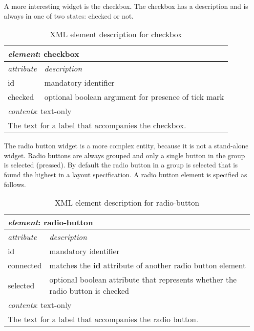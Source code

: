 \documentclass{article}
\begin{document}
    A more interesting widget is the checkbox. The checkbox has a description
    and is always in one of two states: checked or not. 
    
    \begin{table}[H]
     \begin{center}
     \begin{tabular}{|l|l|}
       \hline
        \multicolumn{2}{|l|}{\textit{element}: checkbox} \\
       \hline \hline
        \textit{attribute} & \textit{description} \\
       \hline
        id                 & mandatory identifier \\
        checked            & optional boolean argument for presence of tick mark \\
       \hline \hline
        \multicolumn{2}{|l|}{\textit{contents}: text-only} \\
       \hline
         \multicolumn{2}{|l|}{The text for a label that accompanies the checkbox.} \\
       \hline
     \end{tabular}
     \end{center}
     \label{figure:element_checkbox}
     \caption{XML element description for checkbox}
    \end{table}

    The radio button widget is a more complex entity, because it is not a
    stand-alone widget. Radio buttons are always grouped and only a single button in the
    group is selected (pressed).  By default the radio button in a group is
    selected that is found the highest in a layout specification. A radio button
    element is specified as follows.

    \begin{table}[H]
     \begin{center}
     \begin{tabular}{|l|l|}
       \hline
        \multicolumn{2}{|l|}{\textit{element}: radio-button} \\
       \hline \hline
        \textit{attribute} & \textit{description} \\
       \hline
        id                 & mandatory identifier \\
        connected          & matches the \textbf{id} attribute of another radio button element \\
        selected           & optional boolean attribute that represents whether the radio button is checked \\
       \hline \hline
        \multicolumn{2}{|l|}{\textit{contents}: text-only} \\
       \hline
         \multicolumn{2}{|l|}{The text for a label that accompanies the radio button.} \\
       \hline
     \end{tabular}
     \end{center}
     \label{figure:element_radio_button}
     \caption{XML element description for radio-button}
    \end{table}
\end{document}
